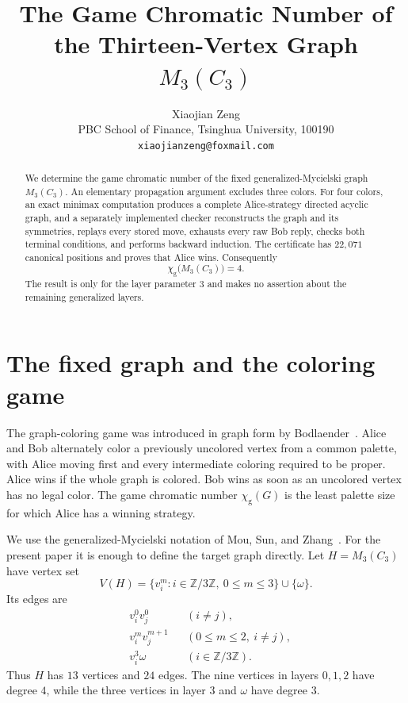 \documentclass[11pt]{article}
\title{The Game Chromatic Number of the Thirteen-Vertex Graph
$M_{3}(C_{3})$}
\author{Xiaojian Zeng\\
PBC School of Finance, Tsinghua University, 100190\\
\texttt{xiaojianzeng@foxmail.com}}
\date{}
\newcommand{\Zthree}{\mathbb Z/3\mathbb Z}
\newcommand{\chig}{\chi_{\mathrm g}}
\begin{document}
\maketitle

\begin{abstract}
We determine the game chromatic number of the fixed generalized-Mycielski
graph $M_{3}(C_{3})$.  An elementary propagation argument excludes three
colors.  For four colors, an exact minimax computation produces a complete
Alice-strategy directed acyclic graph, and a separately implemented checker
reconstructs the graph and its symmetries, replays every stored move, exhausts
every raw Bob reply, checks both terminal conditions, and performs backward
induction.  The certificate has $22{,}071$ canonical positions and proves
that Alice wins.  Consequently
\[
                 \chig\bigl(M_{3}(C_{3})\bigr)=4.
\]
The result is only for the layer parameter $3$ and makes no assertion about
the remaining generalized layers.
\end{abstract}

\section{The fixed graph and the coloring game}

The graph-coloring game was introduced in graph form by
Bodlaender~\cite{Bodlaender1991}.  Alice and Bob alternately color a previously
uncolored vertex from a common palette, with Alice moving first and every
intermediate coloring required to be proper.  Alice wins if the whole graph
is colored.  Bob wins as soon as an uncolored vertex has no legal color.  The
game chromatic number $\chig(G)$ is the least palette size for which Alice has
a winning strategy.

We use the generalized-Mycielski notation of Mou, Sun, and
Zhang~\cite{MouSunZhang2026}.  For the present paper it is enough to define the
target graph directly.  Let $H=M_{3}(C_{3})$ have vertex set
\[
 V(H)=\{v_i^m:i\in\Zthree,\ 0\leq m\leq3\}\cup\{\omega\}.
\]
Its edges are
\begin{align*}
 &v_i^0v_j^0 &&(i\ne j),\\
 &v_i^mv_j^{m+1} &&(0\leq m\leq2,\ i\ne j),\\
 &v_i^3\omega &&(i\in\Zthree).
\end{align*}
Thus $H$ has $13$ vertices and $24$ edges.  The nine vertices in layers
$0,1,2$ have degree $4$, while the three vertices in layer $3$ and $\omega$
have degree $3$.
\end{document}
